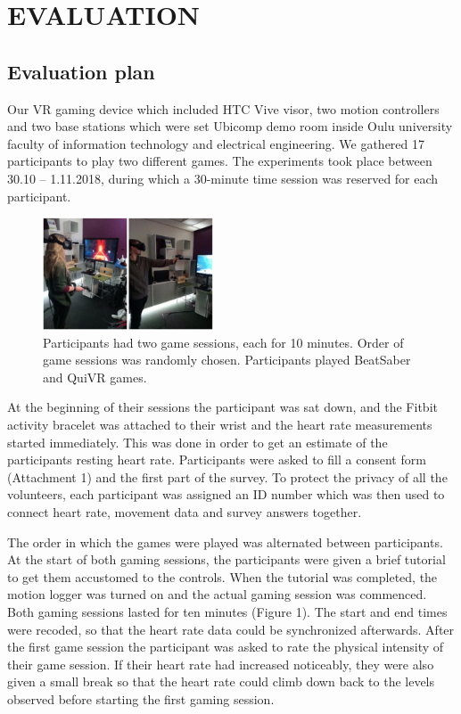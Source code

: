 \documentclass{sig-alternate-05-2015}
\begin{document}
\section{EVALUATION}
\subsection{Evaluation plan}
Our VR gaming device which included HTC Vive visor, two motion controllers and two base 
stations which were set Ubicomp demo room inside Oulu university faculty of information 
technology and electrical engineering. We gathered 17 participants to play two different 
games. The experiments took place between 30.10 – 1.11.2018, during which a 30-minute 
time session was reserved for each participant. 

\begin{figure}
    \centering
    \includegraphics[width=0.45\textwidth]{players}
    \caption
        {
            Participants had two game sessions, each for 10 minutes. 
            Order of game sessions was randomly chosen. Participants played 
            BeatSaber and QuiVR games. 
        }
\end{figure}

At the beginning of their sessions the participant was sat down, and the Fitbit activity 
bracelet was attached to their wrist and the heart rate measurements started immediately. 
This was done in order to get an estimate of the participants resting heart rate.  
Participants were asked to fill a consent form (Attachment 1) and the first part of the 
survey. To protect the privacy of all the volunteers, each participant was assigned an 
ID number which was then used to connect heart rate, movement data and survey answers 
together. 

The order in which the games were played was alternated between participants. At the 
start of both gaming sessions, the participants were given a brief tutorial to get them 
accustomed to the controls. When the tutorial was completed, the motion logger was 
turned on and the actual gaming session was commenced. Both gaming sessions lasted for 
ten minutes (Figure 1). The start and end times were recoded, so that the heart rate 
data could be synchronized afterwards. After the first game session the participant was 
asked to rate the physical intensity of their game session. If their heart rate had 
increased noticeably, they were also given a small break so that the heart rate could 
climb down back to the levels observed before starting the first gaming session. 
\end{document}
